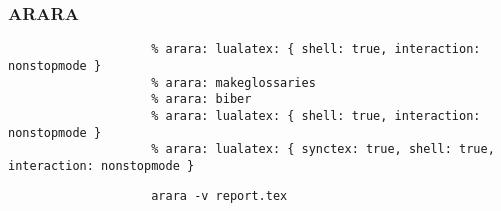 \documentclass{beamer}
\begin{document}
        \begin{frame}[fragile]
            \frametitle{ARARA}
            \begin{centering}
                \begin{verbatim}
                    % arara: lualatex: { shell: true, interaction: nonstopmode }
                    % arara: makeglossaries
                    % arara: biber
                    % arara: lualatex: { shell: true, interaction: nonstopmode }
                    % arara: lualatex: { synctex: true, shell: true, interaction: nonstopmode }
                \end{verbatim}
                \begin{verbatim}
                    arara -v report.tex
                \end{verbatim}
            \end{centering}
        \end{frame}
\end{document}
